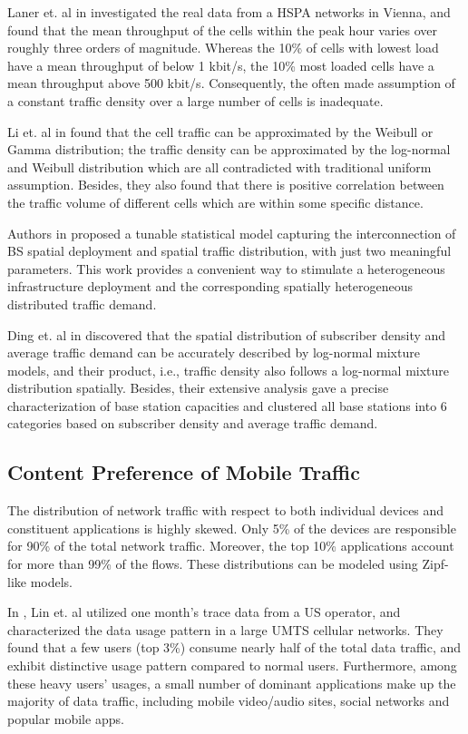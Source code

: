 {Laner et. al in \cite{laner2012users} investigated the real data from a HSPA networks in Vienna, and found that the mean throughput of the cells within the peak hour varies over roughly three orders of magnitude. Whereas the 10\% of cells with lowest load have a mean throughput of below 1 kbit/s, the 10\% most loaded cells have a mean throughput above 500 kbit/s. Consequently, the often made assumption of a constant traffic density over a large number of cells is inadequate.

Li et. al in \cite{lee2014spatial} found that the cell traffic can be approximated by the Weibull or Gamma distribution; the traffic density can be approximated by the log-normal and Weibull distribution which are all contradicted with traditional uniform assumption. Besides, they also found that there is positive correlation between the traffic volume of different cells which are within some specific distance.

Authors in \cite{mirahsan2015hethetnets} proposed a tunable statistical model capturing the interconnection of BS spatial deployment and spatial traffic distribution, with just two meaningful parameters. This work provides a convenient way to stimulate a heterogeneous infrastructure deployment and the corresponding spatially heterogeneous distributed traffic demand.

Ding et. al in \cite{ding2016measurement} discovered that the spatial distribution of subscriber density and average traffic demand can be accurately described by log-normal mixture models, and their product, i.e., traffic density also follows a log-normal mixture distribution spatially. Besides, their extensive analysis gave a precise characterization of base station capacities and clustered all base stations into 6 categories based on subscriber density and average traffic demand.

\subsection{Content Preference of Mobile Traffic}
\cite{shafiq2011characterizing} The distribution of network traffic with respect to both individual devices and constituent applications is highly skewed. Only 5\% of the devices are responsible for 90\% of the total network traffic. Moreover, the top 10\% applications account for more than 99\% of the flows. These distributions can be modeled using Zipf-like models.

In \cite{jin2012characterizing}, Lin et. al utilized one month's trace data from a US operator, and characterized the data usage pattern in a large UMTS cellular networks. They found that a few users (top 3\%) consume nearly half of the total data traffic, and exhibit distinctive usage pattern compared to normal users. Furthermore, among these heavy users' usages, a small number of dominant applications make up the majority of data traffic, including mobile video/audio sites, social networks and popular mobile apps.

}

